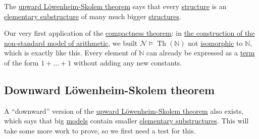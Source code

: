 \begin{intuition}
	The \hyperref[thm:upward-Lowenheim-Skolem]{upward Löwenheim-Skolem theorem} says that every \hyperref[def:structure]{structure} is an \hyperref[def:elementary-substructure]{elementary substructure} of many much bigger \hyperref[def:structure]{structures}.
\end{intuition}

\begin{prev}
	Our very first application of the \hyperref[thm:compactness]{compactness theorem}: in \hyperref[eg:construction-non-standard-model-of-arithmetic]{the construction of the non-standard model of arithmetic}, we built \(\mathcal{N} \models \mathop{\mathrm{Th}}(\mathbb{N} ) \) not \hyperref[def:isomorphism]{isomorphic} to \(\mathbb{N} \), which is exactly like this. Every element of \(\mathbb{N} \) can already be expressed as a \hyperref[def:term]{term} of the form \(1+\dots +1\) without adding any new constants.
\end{prev}

\subsection{Downward Löwenheim-Skolem theorem}
A ``downward'' version of the \hyperref[thm:upward-Lowenheim-Skolem]{upward Löwenheim-Skolem theorem} also exists, which says that big \hyperref[def:model]{models} contain smaller \hyperref[def:elementary-substructure]{elementary substructures}. This will take some more work to prove, so we first need a test for this.

